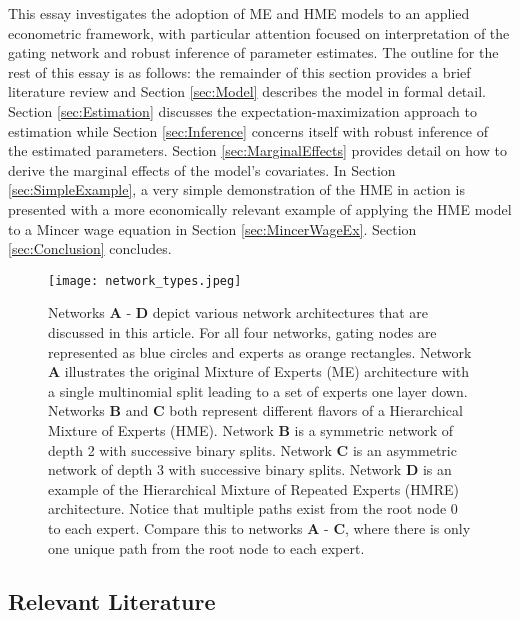 \documentclass[12pt]{article}
\theoremstyle{definition}
\begin{document}
\bigskip

This essay investigates the adoption of ME and HME models to an applied
econometric framework, with particular attention focused on interpretation of
the gating network and robust inference of parameter estimates. The outline for the
rest of this essay is as follows: the remainder of this section
provides a brief literature review and Section \ref{sec:Model} describes
the model in formal detail. Section \ref{sec:Estimation} discusses the
expectation-maximization approach to estimation while Section \ref{sec:Inference}
concerns itself with robust inference of the estimated parameters.
Section \ref{sec:MarginalEffects} provides detail on how to derive the
marginal effects of the model's covariates. In Section \ref{sec:SimpleExample},
a very simple demonstration of the HME in action is presented with 
a more economically relevant example of applying the HME model to
a Mincer wage equation in Section \ref{sec:MincerWageEx}. Section
\ref{sec:Conclusion} concludes.

\begin{figure}[!ht]
  \centering
  \texttt{[image: network\_types.jpeg]}
  \caption{Networks \textbf{A} - \textbf{D} depict various network
  architectures that are discussed in this article. For all four networks,
  gating nodes are represented as blue circles and experts as orange
  rectangles. Network \textbf{A} illustrates the original Mixture of
  Experts (ME) architecture with a single multinomial split leading
  to a set of experts one layer down. Networks \textbf{B} and \textbf{C} both
  represent different flavors of a Hierarchical Mixture of Experts (HME). Network
  \textbf{B} is a symmetric network of depth 2 with successive binary splits.
  Network \textbf{C} is an asymmetric network of depth 3 with successive
  binary splits. Network \textbf{D} is an example of the Hierarchical
  Mixture of Repeated Experts (HMRE) architecture. Notice that multiple paths
  exist from the root node $0$ to each expert. Compare this to networks
  \textbf{A} - \textbf{C}, where there is only one unique path from the root
  node to each expert.}
  \label{fig:network_comparison}
\end{figure}


\subsection{Relevant Literature}
\end{document}
